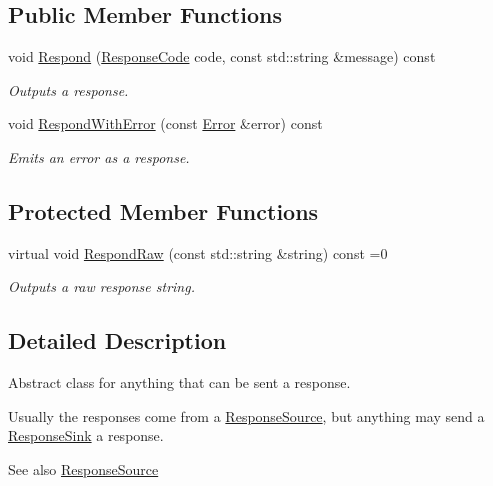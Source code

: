 \subsection*{Public Member Functions}
\begin{DoxyCompactItemize}
\item 
void \hyperlink{classResponseSink_ac2add6144c2804a6f0db34ad30046ed7}{Respond} (\hyperlink{io__response_8hpp_af5828b68a5f305a17b90321710d9b546}{Response\+Code} code, const std\+::string \&message) const 
\begin{DoxyCompactList}\small\item\em Outputs a response. \end{DoxyCompactList}\item 
void \hyperlink{classResponseSink_a42833a0f1f5e250aa7a41e8bb2fdaac9}{Respond\+With\+Error} (const \hyperlink{classError}{Error} \&error) const 
\begin{DoxyCompactList}\small\item\em Emits an error as a response. \end{DoxyCompactList}\end{DoxyCompactItemize}
\subsection*{Protected Member Functions}
\begin{DoxyCompactItemize}
\item 
virtual void \hyperlink{classResponseSink_a128a514e39f23f2bcc97fea62e9de3c5}{Respond\+Raw} (const std\+::string \&string) const =0
\begin{DoxyCompactList}\small\item\em Outputs a raw response string. \end{DoxyCompactList}\end{DoxyCompactItemize}


\subsection{Detailed Description}
Abstract class for anything that can be sent a response. 

Usually the responses come from a \hyperlink{classResponseSource}{Response\+Source}, but anything may send a \hyperlink{classResponseSink}{Response\+Sink} a response. \begin{DoxySeeAlso}{See also}
\hyperlink{classResponseSource}{Response\+Source} 
\end{DoxySeeAlso}


